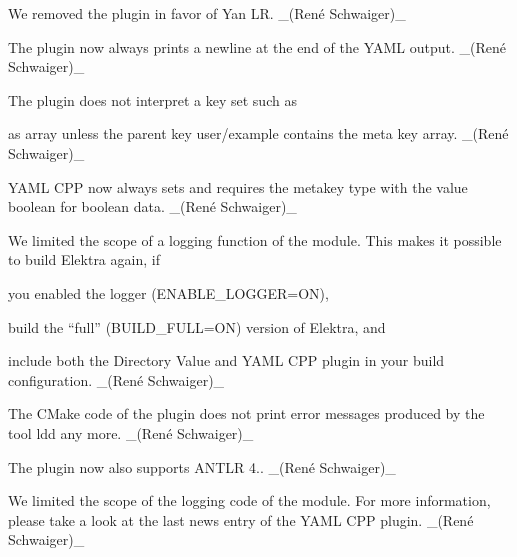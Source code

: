 \begin{DoxyItemize}
\item We removed the plugin in favor of Yan LR. \+\_\+(René Schwaiger)\+\_\+
\end{DoxyItemize}


\begin{DoxyItemize}
\item The plugin now always prints a newline at the end of the Y\+A\+ML output. \+\_\+(René Schwaiger)\+\_\+
\item The plugin does not interpret a key set such as
\end{DoxyItemize}




as array unless the parent key {\ttfamily user/example} contains the meta key {\ttfamily array}. \+\_\+(René Schwaiger)\+\_\+


\begin{DoxyItemize}
\item Y\+A\+ML C\+PP now always sets and requires the metakey {\ttfamily type} with the value {\ttfamily boolean} for boolean data. \+\_\+(René Schwaiger)\+\_\+
\item We limited the scope of a logging function of the module. This makes it possible to build Elektra again, if
\begin{DoxyItemize}
\item you enabled the logger ({\ttfamily E\+N\+A\+B\+L\+E\+\_\+\+L\+O\+G\+G\+ER=ON}),
\item build the “full” ({\ttfamily B\+U\+I\+L\+D\+\_\+\+F\+U\+LL=ON}) version of Elektra, and
\item include both the Directory Value and Y\+A\+ML C\+PP plugin in your build configuration. \+\_\+(René Schwaiger)\+\_\+
\end{DoxyItemize}
\end{DoxyItemize}


\begin{DoxyItemize}
\item The C\+Make code of the plugin does not print error messages produced by the tool {\ttfamily ldd} any more. \+\_\+(René Schwaiger)\+\_\+
\item The plugin now also supports A\+N\+T\+LR 4.. \+\_\+(René Schwaiger)\+\_\+
\item We limited the scope of the logging code of the module. For more information, please take a look at the last news entry of the Y\+A\+ML C\+PP plugin. \+\_\+(René Schwaiger)\+\_\+
\end{DoxyItemize}



